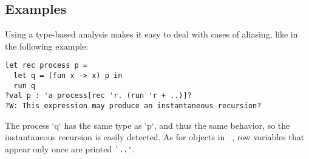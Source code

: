 \documentclass[9pt]{sigplanconf}
\begin{document}
\subsection{Examples}
%

Using a type-based analysis makes it easy to deal with cases of aliasing, like in the following example:
\begin{lstlisting}
let rec process p =
  let q = (fun x -> x) p in
  run q 
?val p : 'a process[rec 'r. (run 'r + ..)]?
?W: This expression may produce an instantaneous recursion?
\end{lstlisting}
The process `q` has the same type as `p`, and thus the same behavior, so the instantaneous recursion is easily detected. As for objects in \ocaml~\cite{Vouillon:2008}, row variables that appear only once are printed \verb+`..'+.
\end{document}
